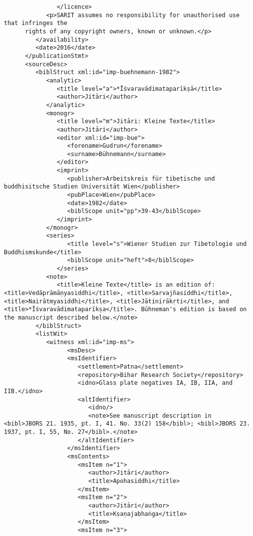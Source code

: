 \documentclass[article,12pt,a4paper]{memoir}%
\begin{document}
\begin{verbatim}
	           </licence>
            <p>SARIT assumes no responsibility for unauthorised use that infringes the
	  rights of any copyright owners, known or unknown.</p>
         </availability>
         <date>2016</date>
      </publicationStmt>
      <sourceDesc>
         <biblStruct xml:id="imp-buehnemann-1982">
            <analytic>
               <title level="a">*Īśvaravādimataparīkṣā</title>
               <author>Jitāri</author>
            </analytic>
            <monogr>
               <title level="m">Jitāri: Kleine Texte</title>
               <author>Jitāri</author>
               <editor xml:id="imp-bue">
                  <forename>Gudrun</forename> 
                  <surname>Bühnemann</surname>
               </editor>
               <imprint>
                  <publisher>Arbeitskreis für tibetische und buddhisitsche Studien Universität Wien</publisher>
                  <pubPlace>Wien</pubPlace>
                  <date>1982</date>
                  <biblScope unit="pp">39-43</biblScope>
               </imprint>
            </monogr>
            <series>
	              <title level="s">Wiener Studien zur Tibetologie und Buddhismskunde</title>
	              <biblScope unit="heft">8</biblScope>
	           </series>
            <note>
               <title>Kleine Texte</title> is an edition of: <title>Vedāprāmāṇyasiddhi</title>, <title>Sarvajñasiddhi</title>, <title>Nairātmyasiddhi</title>, <title>Jātinirākṛti</title>, and <title>*Īśvaravādimataparīkṣa</title>. Bühneman's edition is based on the manuscript described below.</note>
         </biblStruct>
         <listWit>
            <witness xml:id="imp-ms">
	              <msDesc>
                  <msIdentifier>
                     <settlement>Patna</settlement>
                     <repository>Bihar Research Society</repository>
                     <idno>Glass plate negatives IA, IB, IIA, and  IIB.</idno>
                     <altIdentifier>
                        <idno/>
                        <note>See manuscript description in <bibl>JBORS 21. 1935, pt. I, 41. No. 33(2) 158</bibl>; <bibl>JBORS 23. 1937, pt. I, 55, No. 27</bibl>.</note>
                     </altIdentifier>
                  </msIdentifier>
                  <msContents>
                     <msItem n="1">
                        <author>Jitāri</author>
                        <title>Apohasiddhi</title>
                     </msItem>
                     <msItem n="2">
                        <author>Jitāri</author>
                        <title>Kṣaṇajabhaṅga</title>
                     </msItem>
                     <msItem n="3">

\end{verbatim}
\end{document}
